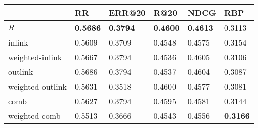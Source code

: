\begin{tabular}{llllll}
\toprule
{} &               RR &           ERR@20 &           R@20 &             NDCG &              RBP \\
\midrule
$R$              &  \textbf{0.5686} &  \textbf{0.3794} &  \textbf{0.4600}& \textbf{0.4613} &           0.3113 \\
inlink           &           0.5609 &           0.3709 &         0.4548 &           0.4575 &           0.3154 \\
weighted-inlink  &           0.5667 &           0.3794 &         0.4536 &           0.4605 &           0.3106 \\
outlink          &           0.5686 &           0.3794 &         0.4537 &           0.4604 &           0.3087 \\
weighted-outlink &           0.5631 &           0.3518 &         0.4600 &           0.4577 &           0.3081 \\
comb             &           0.5627 &           0.3794 &         0.4595 &           0.4581 &           0.3144 \\
weighted-comb    &           0.5513 &           0.3666 &         0.4543 &           0.4556 &  \textbf{0.3166} \\
\bottomrule
\end{tabular}
